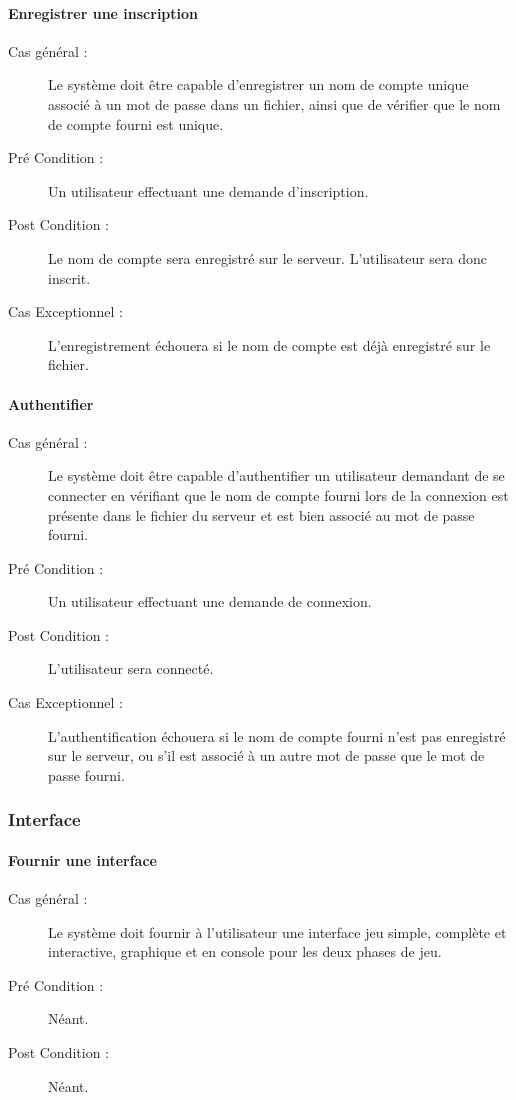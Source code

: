 \documentclass[a4paper]{article}
\begin{document}
\paragraph{Enregistrer une inscription}
\begin{description}
\item[Cas général :] Le système doit être capable d'enregistrer un nom de compte unique associé à un mot de passe dans un fichier, ainsi que de vérifier que le nom de compte fourni est unique.
\item[Pré Condition  :] Un \gls{utilisateur} effectuant une demande d'inscription.
\item[Post Condition :] Le nom de compte sera enregistré sur le serveur. L'\gls{utilisateur} sera donc inscrit.
\item[Cas Exceptionnel :] L'enregistrement échouera si le nom de compte est déjà enregistré sur le fichier.
\end{description}

\paragraph{Authentifier}
\begin{description}
\item[Cas général :] Le système doit être capable d'authentifier un \gls{utilisateur} demandant de se connecter en vérifiant que le nom de compte fourni lors de la connexion est présente dans le fichier du \gls{serveur} et est bien associé au mot de passe fourni.
\item[Pré Condition  :] Un \gls{utilisateur} effectuant une demande de connexion.
\item[Post Condition :] L'\gls{utilisateur} sera connecté.
\item[Cas Exceptionnel :] L'authentification échouera si le nom de compte fourni n'est pas enregistré sur le serveur, ou s'il est associé à un autre mot de passe que le mot de passe fourni.
\end{description}

\subsubsection{Interface}
\paragraph{Fournir une interface}
\begin{description}
\item[Cas général :] Le système doit fournir à l'\gls{utilisateur} une interface jeu simple, complète et interactive, graphique et en console pour les deux phases de jeu.
\item[Pré Condition  :] Néant.
\item[Post Condition :] Néant.
\end{description}
\end{document}
